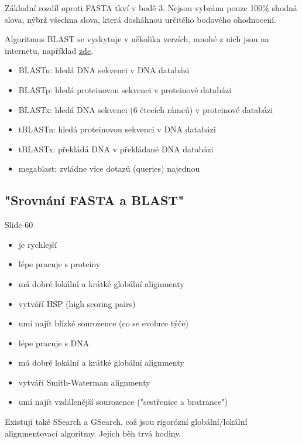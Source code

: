\documentclass[DIV=8]{scrreprt}
\begin{document}
Základní rozdíl oproti FASTA tkví v bodě 3. Nejsou vybrána pouze 100\% shodná slova, nýbrž všechna slova, která dosháhnou určitého bodového ohodnocení.

Algoritmus BLAST se vyskytuje v několika verzích, mnohé z nich jsou na internetu, například \href{https://blast.ncbi.nlm.nih.gov/Blast.cgi}{zde}.

\begin{itemize}
    \item BLASTn: hledá DNA sekvenci v DNA databázi
    \item BLASTp: hledá proteinovou sekvenci v proteinové databázi
    \item BLASTx: hledá DNA sekvenci (6 čtecích rámců) v proteinové databázi
    \item tBLASTn: hledá proteinovou sekvenci v DNA databázi
    \item tBLASTx: překládá DNA v překládané DNA databázi
    \item megablast: zvládne více dotazů (queries) najednou
\end{itemize}


\subsection{"Srovnání FASTA a BLAST"}

Slide 60
\begin{itemize}
    \item je rychlejší
    \item lépe pracuje s proteiny
    \item má dobré lokální a krátké globální alignmenty
    \item vytváří HSP (high scoring pairs)
    \item umí najít blízké sourozence (co se evoluce týče)
\end{itemize}


\begin{itemize}
    \item lépe pracuje s DNA
    \item má dobré lokální a krátké globální alignmenty
    \item vytváří Smith-Waterman alignmenty
    \item umí najít vzdálenější sourozence ("sestřenice a bratrance")
\end{itemize}


Existují také SSearch a GSearch, což jsou rigorózní globální/lokální alignmentovací algoritmy. Jejich běh trvá hodiny.
\end{document}
